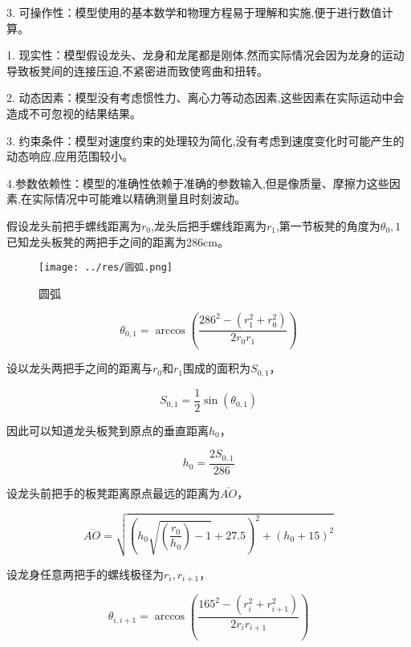 3. 可操作性：模型使用的基本数学和物理方程易于理解和实施,便于进行数值计算。

1. 现实性：模型假设龙头、龙身和龙尾都是刚体,然而实际情况会因为龙身的运动导致板凳间的连接压迫,不紧密进而致使弯曲和扭转。

2. 动态因素：模型没有考虑惯性力、离心力等动态因素,这些因素在实际运动中会造成不可忽视的结果结果。

3. 约束条件：模型对速度约束的处理较为简化,没有考虑到速度变化时可能产生的动态响应,应用范围较小。

4.参数依赖性：模型的准确性依赖于准确的参数输入,但是像质量、摩擦力这些因素,在实际情况中可能难以精确测量且时刻波动。





假设龙头前把手螺线距离为$r_0$,龙头后把手螺线距离为$r_1$,第一节板凳的角度为$\theta_0,1$已知龙头板凳的两把手之间的距离为286cm。
\begin{figure}[htbp]
	\centering
	\texttt{[image: ../res/圆弧.png]}
	\caption{圆弧}
	\label{fig:YuanHu}
\end{figure}

\begin{equation}
	\theta_{0,1} = \arccos\left(\frac{286^2 - (r_1^2 + r_0^2)}{2r_0r_1}\right)
\end{equation}

设以龙头两把手之间的距离与$r_0$和$r_1$围成的面积为$S_{0,1}$，

\begin{equation}
	S_{0,1} = \frac{1}{2} \sin(\theta_{0,1})
\end{equation}

因此可以知道龙头板凳到原点的垂直距离$h_0$，

\begin{equation}
	h_0 = \frac{2S_{0,1}}{286}
\end{equation}

设龙头前把手的板凳距离原点最远的距离为$\overline{AO}$，

\begin{equation}
	\overline{AO} = \sqrt{\left(h_0 \sqrt{\left(\frac{r_0}{h_0}\right) - 1} + 27.5\right)^2 + (h_0 + 15)^2}
\end{equation}

设龙身任意两把手的螺线极径为$r_i, r_{i+1}$，

\begin{equation}
	\theta_{i,i+1} = \arccos\left(\frac{165^2 - (r_i^2 + r_{i+1}^2)}{2r_ir_{i+1}}\right)
\end{equation}

